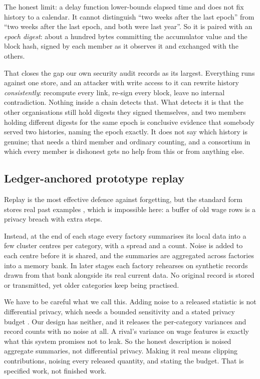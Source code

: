 \documentclass[11pt,a4paper]{article}
\begin{document}
The honest limit: a delay function lower-bounds elapsed time and does not fix
history to a calendar. It cannot distinguish ``two weeks after the last epoch''
from ``two weeks after the last epoch, and both were last year''. So it is paired
with an \emph{epoch digest}: about a hundred bytes committing the accumulator
value and the block hash, signed by each member as it observes it and exchanged
with the others.

That closes the gap our own security audit records as its largest. Everything runs
against one store, and an attacker with write access to it can rewrite history
\emph{consistently}: recompute every link, re-sign every block, leave no
internal contradiction. Nothing inside a chain detects that. What detects it is
that the other organisations still hold digests they signed themselves, and two
members holding different digests for the same epoch is conclusive evidence that
somebody served two histories, naming the epoch exactly. It does not say which
history is genuine; that needs a third member and ordinary counting, and a
consortium in which every member is dishonest gets no help from this or from
anything else.


\subsection{Ledger-anchored prototype replay}
\label{sec:replay}

Replay is the most effective defence against forgetting, but the standard form
stores real past examples \citep{rebuffi2017icarl}, which is impossible here: a
buffer of old wage rows is a privacy breach with extra steps.

Instead, at the end of each stage every factory summarises its local data into a
few cluster centres per category, with a spread and a count. Noise is added to
each centre before it is shared, and the summaries are aggregated across
factories into a memory bank. In later stages each factory rehearses on
synthetic records drawn from that bank alongside its real current data. No
original record is stored or transmitted, yet older categories keep being
practised.

We have to be careful what we call this. Adding noise to a released statistic is
not differential privacy, which needs a bounded sensitivity and a stated privacy
budget \citep{dwork2014dp}. Our design has neither, and it releases the
per-category variances and record counts with no noise at all. A rival's
variance on wage features is exactly what this system promises not to leak. So
the honest description is noised aggregate summaries, not differential privacy.
Making it real means clipping contributions, noising every released quantity,
and stating the budget. That is specified work, not finished work.
\end{document}
